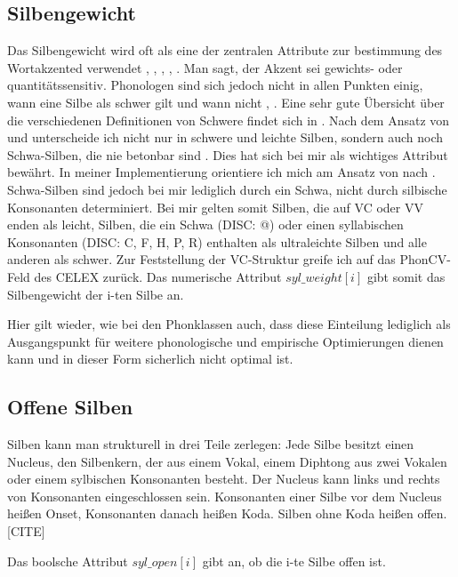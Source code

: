 \subsection{Silbengewicht}
Das Silbengewicht wird oft als eine der zentralen Attribute zur bestimmung des Wortakzented verwendet \cite[S.~69]{Janssen2003}, \cite{Giegerich1985}, \cite{Fery1998}, \cite[S.~2ff]{Prince1990}, \cite{Mengel1998}. Man sagt, der Akzent sei gewichts- oder quantitätssensitiv. \cite[S.~3]{Janssen2003}
Phonologen sind sich jedoch nicht in allen Punkten einig, wann eine Silbe als schwer gilt und wann nicht \cite[S.~3]{Janssen2003}, \cite[S.~34]{Kaltenbacher1994}. Eine sehr gute Übersicht über die verschiedenen Definitionen von Schwere findet sich in \cite[S.~38]{Mengel1998}.
Nach dem Ansatz von \cite[S.~46]{Eisenberg1991} und \cite[S.~330f]{Wagner2001} unterscheide ich nicht nur in schwere und leichte Silben, sondern auch noch Schwa-Silben, die nie betonbar sind \cite[S.103]{Fery1998}. Dies hat sich bei mir als wichtiges Attribut bewährt.
In meiner Implementierung orientiere ich mich am Ansatz von \cite[S.~330f]{Wagner2001} nach \cite{Fery1998}. Schwa-Silben sind jedoch bei mir lediglich durch ein Schwa, nicht durch silbische Konsonanten determiniert. Bei mir gelten somit Silben, die auf VC oder VV enden als leicht, Silben, die ein Schwa (DISC: @) oder einen syllabischen Konsonanten (DISC: C, F, H, P, R) enthalten als ultraleichte Silben und alle anderen als schwer. Zur Feststellung der VC-Struktur greife ich auf das PhonCV-Feld des CELEX zurück. Das numerische Attribut $syl\_weight[i]$ gibt somit das Silbengewicht der i-ten Silbe an.

Hier gilt wieder, wie bei den Phonklassen auch, dass diese Einteilung lediglich als Ausgangspunkt für weitere phonologische und empirische Optimierungen dienen kann und in dieser Form sicherlich nicht optimal ist.

\subsection{Offene Silben}
Silben kann man strukturell in drei Teile zerlegen: Jede Silbe besitzt einen Nucleus, den Silbenkern, der aus einem Vokal, einem Diphtong aus zwei Vokalen oder einem sylbischen Konsonanten besteht. Der Nucleus kann links und rechts von Konsonanten eingeschlossen sein. Konsonanten einer Silbe vor dem Nucleus heißen Onset, Konsonanten danach heißen Koda. Silben ohne Koda heißen offen. [CITE]

Das boolsche Attribut $syl\_open[i]$ gibt an, ob die i-te Silbe offen ist.

